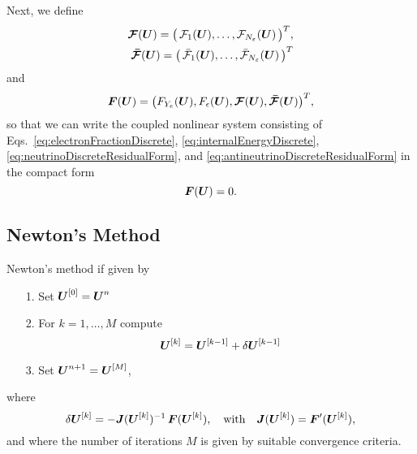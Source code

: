 \documentclass[12pt]{article}
\begin{document}
Next, we define
\begin{align}
  \boldsymbol{\mathcal{F}}(\boldsymbol{U})=\big(\,\mathcal{F}_{1}(\boldsymbol{U}),\ldots,\mathcal{F}_{N_{\varepsilon}}(\boldsymbol{U})\,\big)^{T}, \\
  \boldsymbol{\bar{\mathcal{F}}}(\boldsymbol{U})=\big(\,\bar{\mathcal{F}}_{1}(\boldsymbol{U}),\ldots,\bar{\mathcal{F}}_{N_{\varepsilon}}(\boldsymbol{U})\,\big)^{T}
\end{align}
and
\begin{equation}
  \boldsymbol{F}(\boldsymbol{U})=\big(F_{Y_{e}}(\boldsymbol{U}),F_{\epsilon}(\boldsymbol{U}),\boldsymbol{\mathcal{F}}(\boldsymbol{U}),\boldsymbol{\bar{\mathcal{F}}}(\boldsymbol{U})\big)^{T},
\end{equation}
so that we can write the coupled nonlinear system consisting of Eqs.~\eqref{eq:electronFractionDiscrete}, \eqref{eq:internalEnergyDiscrete}, \eqref{eq:neutrinoDiscreteResidualForm}, and \eqref{eq:antineutrinoDiscreteResidualForm} in the compact form
\begin{equation}
  \boldsymbol{F}(\boldsymbol{U}) = 0.
  \label{eq:nonlinearSystemResidualForm}
\end{equation}

\subsection{Newton's Method}

Newton's method if given by
\begin{itemize}
  \item[1.] Set $\boldsymbol{U}^{[0]} = \boldsymbol{U}^{n}$
  \item[2.] For $k=1,\ldots,M$ compute
  \begin{equation}
    \boldsymbol{U}^{[k]}=\boldsymbol{U}^{[k-1]} + \delta\boldsymbol{U}^{[k-1]}
  \end{equation}
  \item[3.] Set $\boldsymbol{U}^{n+1}=\boldsymbol{U}^{[M]}$,
\end{itemize}
where
\begin{equation}
  \delta\boldsymbol{U}^{[k]} = - \boldsymbol{J}(\boldsymbol{U}^{[k]})^{-1}\,\boldsymbol{F}(\boldsymbol{U}^{[k]}), \quad\text{with}\quad \boldsymbol{J}(\boldsymbol{U}^{[k]})=\boldsymbol{F}'(\boldsymbol{U}^{[k]}),
\end{equation}
and where the number of iterations $M$ is given by suitable convergence criteria.  
\end{document}
